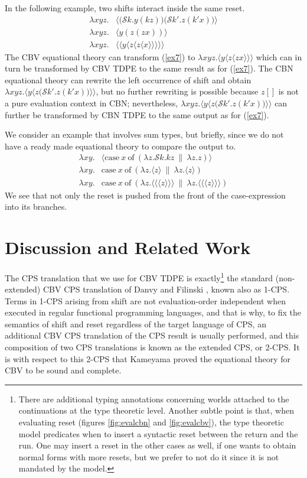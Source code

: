 \documentclass{eptcs}
\newcommand{\ureset}[1]{\langle{#1}\rangle}
\newcommand{\ushift}[2]{\mathcal{S}{#1}.{#2}}
\theoremstyle{definition}
\theoremstyle{plain}
\theoremstyle{remark}
\begin{document}
In the following example, two shifts interact inside the same reset.
\begin{align}
\lambda x y z.& \ureset{\big(\ushift{k}{y(k z)}\big)\big(\ushift{k'}{z(k' x)}\big)}\label{ex7}\\
\lambda x y z.& \ureset{y(z(zx))} \tag{CBV}\\
\lambda x y z.& \ureset{\ureset{y\ureset{z\ureset{z\ureset{x}}}}} \tag{CBN}
\end{align}
The CBV equational theory can transform (\ref{ex7}) to $\lambda x y z.\ureset{y\ureset{z\ureset{z x}}}$ which can in turn be transformed by CBV TDPE to the same result as for (\ref{ex7}). The CBN equational theory can rewrite the left occurrence of shift and obtain $\lambda x y z. \ureset{y\ureset{z\big(\ushift{k'}{z(k' x)}\big)}}$, but no further rewriting is possible because $z[]$ is not a pure evaluation context in CBN; nevertheless, $\lambda x y z. \ureset{y\ureset{z\big(\ushift{k'}{z(k' x)}\big)}}$ can further be transformed by CBN TDPE to the same output as for (\ref{ex7}).

We consider an example that involves sum types, but briefly, since we do not have a ready made equational theory to compare the output to.
\begin{align}
\lambda x y.& \ureset{\text{case}~x~\text{of}~(\lambda z.\ushift{k}{k z} ~\|~ \lambda z.z)}\\
\lambda x y.& \text{case}~x~\text{of}~(\lambda z.\ureset{z} ~\|~ \lambda z.\ureset{z}) \tag{CBV}\\
\lambda x y.& \text{case}~x~\text{of}~(\lambda z.\ureset{\ureset{\ureset{z}}} ~\|~ \lambda z.\ureset{\ureset{\ureset{z}}}) \tag{CBN}
\end{align}
We see that not only the reset is pushed from the front of the case-expression into its branches. 

\section{Discussion and Related Work}\label{sec:conclusion}

The CPS translation that we use for CBV TDPE is exactly\footnote{There are additional typing annotations concerning worlds attached to the continuations at the type theoretic level. Another subtle point is that, when evaluating reset (figures \ref{fig:evalcbn} and \ref{fig:evalcbv}), the type theoretic model predicates when to insert a syntactic reset between the return and the run. One may insert a reset in the other cases as well, if one wants to obtain normal forms with more resets, but we prefer to not do it since it is not mandated by the model.} the standard (non-extended) CBV CPS translation of Danvy and Filinski \cite{DanvyF1990}, known also as 1-CPS. Terms in 1-CPS arising from shift are not evaluation-order independent when executed in regular functional programming languages, and that is why, to fix the semantics of shift and reset regardless of the target language of CPS, an additional CBV CPS translation of the CPS result is usually performed, and this composition of two CPS translations is known as the extended CPS, or 2-CPS. It is with respect to this 2-CPS that Kameyama \cite{Kameyama2007} proved the equational theory for CBV to be sound and complete.
\end{document}
